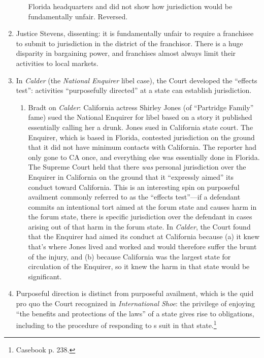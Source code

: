 \begin{enumerate}
\begin{enumerate}
        Florida headquarters and did not show how jurisdiction would be 
        fundamentally unfair. Reversed.
    \end{enumerate}
    \item Justice Stevens, dissenting: it is fundamentally unfair to require a 
    franchisee to submit to jurisdiction in the district of the franchisor. 
    There is a huge disparity in bargaining power, and franchises almost 
    always limit their activities to local markets.
    \item In \emph{Calder} (the \emph{National Enquirer} libel case), the 
    Court developed the ``effects test'': activities ``purposefully 
    directed'' at a state can establish jurisdiction.
    \begin{enumerate}
        \item Bradt on \emph{Calder}: 
        California actress Shirley Jones (of ``Partridge Family'' fame) sued 
        the National Enquirer for libel based on a story it published 
        essentially calling her a drunk. Jones sued in California state 
        court. The Enquirer, which is based in Florida, contested 
        jurisdiction on the ground that it did not have minimum contacts with 
        California. The reporter had only gone to CA once, and everything 
        else was essentially done in Florida. The Supreme Court held that 
        there \emph{was} personal jurisdiction over the Enquirer in California 
        on the ground that it ``expressly aimed'' its conduct toward 
        California. This is an interesting spin on purposeful availment 
        commonly referred to as the ``effects test''---if a defendant commits 
        an intentional tort aimed at the forum state and causes harm in the 
        forum state, there is specific jurisdiction over the defendant in 
        cases arising out of that harm in the forum state. In \emph{Calder}, 
        the Court found that the Enquirer had aimed its conduct at California 
        because (a) it knew that's where Jones lived and worked and would 
        therefore suffer the brunt of the injury, and (b) because California 
        was the largest state for circulation of the Enquirer, so it knew the 
        harm in that state would be significant. 
    \end{enumerate}
    \item Purposeful direction is distinct from purposeful availment, which is 
    the quid pro quo the Court recognized in \emph{International Shoe}: the 
    privilege of enjoying ``the benefits and protections of the laws'' of a 
    state gives rise to obligations, including to the procedure of responding 
    to s suit in that state.\footnote{Casebook p. 238.}
\end{enumerate}

